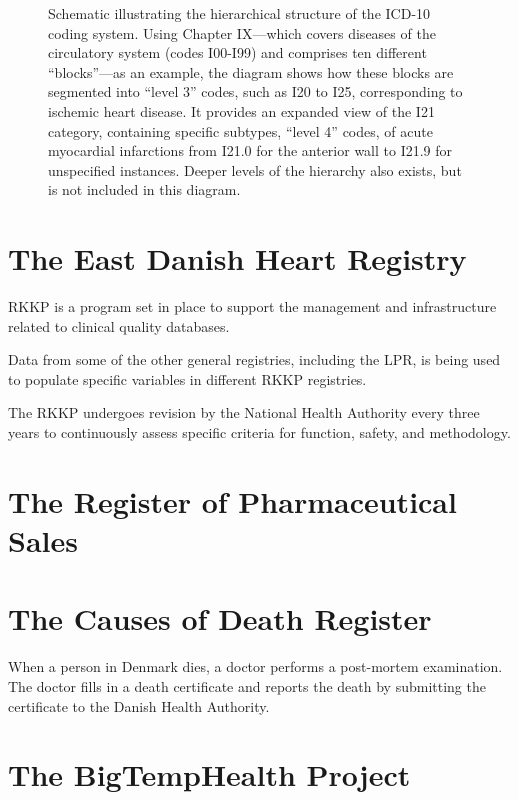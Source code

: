 \begin{figure}
\begin{tikzpicture}
\end{tikzpicture}
\caption[The ICD-10 Hierarchy]{%
    Schematic illustrating the hierarchical structure of the \ac{ICD-10} coding
    system. 
    Using Chapter IX---which covers diseases of the circulatory system
    (codes I00-I99) and comprises ten different \enquote{blocks}---as an example, 
    the diagram shows how these blocks are segmented into 
    \enquote{level 3} codes, such as I20 to I25, 
    corresponding to ischemic heart disease. 
    It provides an expanded view of the I21 category, 
    containing specific subtypes, \enquote{level 4} codes, 
    of acute myocardial infarctions 
    from I21.0 for the anterior wall 
    to I21.9 for unspecified instances. 
    Deeper levels of the hierarchy also exists,
    but is not included in this diagram.
}
\label{fig:icd10-hierarchy}
\end{figure}

\section{The East Danish Heart Registry}

\ac{RKKP} is a program set in place to support the
management and infrastructure related to clinical quality databases.


Data from some of the other general registries, 
including the \ac{LPR}, is being used to populate 
specific variables in different \ac{RKKP} registries.

The \ac{RKKP} undergoes revision by the National Health Authority
every three years to continuously assess specific 
criteria for function, safety, and methodology.


\section{The Register of Pharmaceutical Sales}



\section{The Causes of Death Register}

When a person in Denmark dies, a doctor performs a post-mortem examination. The
doctor fills in a death certificate and reports the death by submitting the
certificate to the Danish Health Authority.

\section{The BigTempHealth Project}


